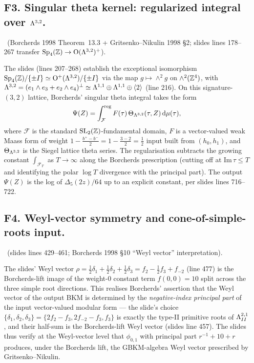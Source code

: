 \subsection*{F3. Singular theta kernel: regularized integral over $\Lambda^{3,2}$.}
\ClaimStatusTheorem\ (Borcherds 1998 Theorem~13.3 + Gritsenko--Nikulin
1998 \S 2; slides lines 178--267 transfer $\mathrm{Sp}_4(\mathbb{Z})\to\mathrm{O}(\Lambda^{3,2})^+$).

The slides (lines 207--268) establish the exceptional isomorphism
$\mathrm{Sp}_4(\mathbb{Z})/\{\pm I\}\simeq \mathrm{O}^+(\Lambda^{3,2})/\{\pm I\}$ via the map $g\mapsto\wedge^2 g$
on $\wedge^2(\mathbb{Z}^4)$, with $\Lambda^{3,2}=(e_1\wedge e_3+e_2\wedge e_4)^{\perp}\simeq
\Lambda^{1,1}\oplus\Lambda^{1,1}\oplus\langle 2\rangle$ (line 216). On this
signature-$(3,2)$ lattice, Borcherds' singular theta integral takes the
form
\[
\Psi(Z) = \int_{\mathcal{F}}^{\mathrm{reg}} F(\tau)\,\Theta_{\Lambda^{3,2}}(\tau,Z)\,\mathrm{d}\mu(\tau),
\]
where $\mathcal{F}$ is the standard $\mathrm{SL}_2(\mathbb{Z})$-fundamental
domain, $F$ is a vector-valued weak Maass form of weight
$1-\tfrac{b^+ - b^-}{2} = 1-\tfrac{3-2}{2}=\tfrac12$ input built from
$(h_0,h_1)$, and $\Theta_{\Lambda^{3,2}}$ is the Siegel lattice theta
series. The regularisation subtracts the growing constant
$\int_{\mathcal{F}_T}$ as $T\to\infty$ along the Borcherds prescription
(cutting off at $\mathrm{Im}\,\tau\leq T$ and identifying the polar
$\log T$ divergence with the principal part). The output $\Psi(Z)$ is
the log of $\Delta_5(2z)/64$ up to an explicit constant, per slides
lines 716--722.

\subsection*{F4. Weyl-vector symmetry and cone-of-simple-roots input.}
\ClaimStatusRemark\ (slides lines 429--461; Borcherds 1998 \S 10
``Weyl vector'' interpretation).

The slides' Weyl vector $\rho=\tfrac12\delta_1+\tfrac12\delta_2+\tfrac12\delta_3=f_2-\tfrac12 f_3+f_{-2}$
(line 477) is the Borcherds-lift image of the weight-0 constant term
$f(0,0)=10$ split across the three simple root directions. This
realises Borcherds' assertion that the Weyl vector of the output BKM is
determined by the \emph{negative-index principal part} of the input
vector-valued modular form --- the slide's choice
$\{\delta_1,\delta_2,\delta_3\}=\{2f_2-f_3,2f_{-2}-f_3,f_3\}$ is exactly the
type-II primitive roots of $\Lambda^{2,1}_{II}$, and their half-sum is the
Borcherds-lift Weyl vector (slides line 457). The slides thus verify at
the Weyl-vector level that $\phi_{0,1}$ with principal part
$r^{-1}+10+r$ produces, under the Borcherds lift, the GBKM-algebra
Weyl vector prescribed by Gritsenko--Nikulin.

